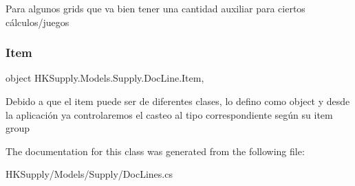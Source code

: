 Para algunos grids que va bien tener una cantidad auxiliar para ciertos cálculos/juegos 

\mbox{\label{class_h_k_supply_1_1_models_1_1_supply_1_1_doc_line_a2906a81d728477297e382ea387d92f33}} 
\subsubsection{\texorpdfstring{Item}{Item}}
{\footnotesize\ttfamily object H\+K\+Supply.\+Models.\+Supply.\+Doc\+Line.\+Item\hspace{0.3cm}{\ttfamily [get]}, {\ttfamily [set]}}



Debido a que el item puede ser de diferentes clases, lo defino como object y desde la aplicación ya controlaremos el casteo al tipo correspondiente según su item group 



The documentation for this class was generated from the following file\+:\begin{DoxyCompactItemize}
\item 
H\+K\+Supply/\+Models/\+Supply/Doc\+Lines.\+cs\end{DoxyCompactItemize}
